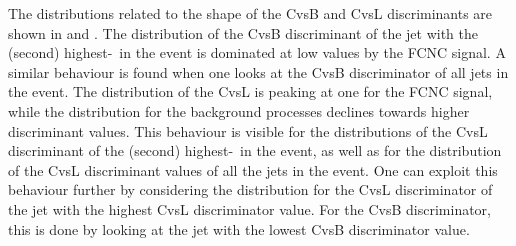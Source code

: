  The distributions related to the shape of the CvsB and CvsL discriminants are shown in  and  . The distribution of the CvsB discriminant of the jet with the (second) highest-\pt\ in the event is dominated at low values by the FCNC signal. A similar behaviour is found when one looks at the CvsB discriminator of all jets in the event. The distribution of the CvsL is peaking at one for the FCNC signal, while the  distribution for the background processes declines towards higher discriminant values. This behaviour is visible for the distributions of the CvsL discriminant of the (second) highest-\pt\ in the event, as well as for the distribution of the CvsL discriminant values of all the jets in the event. One can exploit this behaviour further by considering the distribution for the CvsL discriminator of the jet with the highest CvsL discriminator value. For the CvsB discriminator, this is  done by looking at the jet with the lowest CvsB discriminator value. 
%
